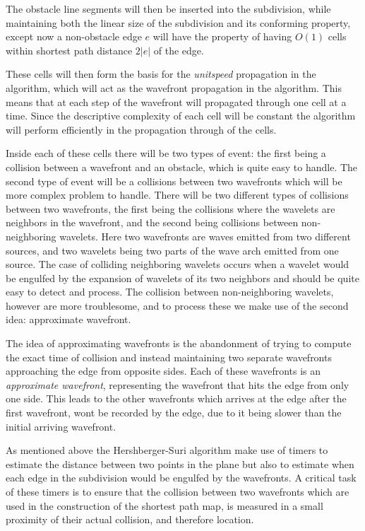 The obstacle line segments will then be inserted into the subdivision, while
maintaining both the linear size of the subdivision and its conforming property, except 
now a non-obstacle edge $e$ will have the property of having $O(1)$ cells within 
shortest path distance $2|e|$ of the edge.

These cells will then form the basis for the \textit{unitspeed} propagation in the 
algorithm, which will act as the wavefront propagation in the algorithm. This means 
that at each step of the wavefront will propagated through one cell at a time. 
Since the descriptive complexity of each cell will be constant the 
algorithm will perform efficiently in the propagation through of the cells.

Inside each of these cells there will be two types of event: the first being a
collision between a wavefront and an obstacle, which is quite easy to handle. The 
second type of event will be a collisions between two wavefronts which will be more 
complex problem to handle. There will be two different types of collisions between two 
wavefronts, the first being the collisions where the wavelets are neighbors in the 
wavefront, and the second being collisions between non-neighboring wavelets. Here two 
wavefronts are waves emitted from two different sources, and two wavelets being two 
parts of the wave arch emitted from one source. The case of colliding neighboring 
wavelets occurs when a wavelet would be engulfed by the expansion of wavelets of its 
two neighbors and should be quite easy to detect and process. The collision between 
non-neighboring wavelets, however are more troublesome, and to process these we make 
use of the second idea: approximate wavefront.

The idea of approximating wavefronts is the abandonment of trying to compute the exact 
time of collision and instead maintaining two separate wavefronts approaching the edge 
from opposite sides. Each of these wavefronts is an \textit{approximate wavefront}, 
representing the wavefront that hits the edge from only one side. This leads to the 
other wavefronts which arrives at the edge after the first wavefront, wont be recorded by 
the edge, due to it being slower than the initial arriving wavefront.

As mentioned above the Hershberger-Suri algorithm make use of timers to estimate the 
distance between two points in the plane but also to estimate when each edge in the 
subdivision would be engulfed by the wavefronts. A critical task of these timers is to 
ensure that the collision between two wavefronts which are used in the construction of 
the shortest path map, is measured in a small proximity of their actual collision, and 
therefore location.

